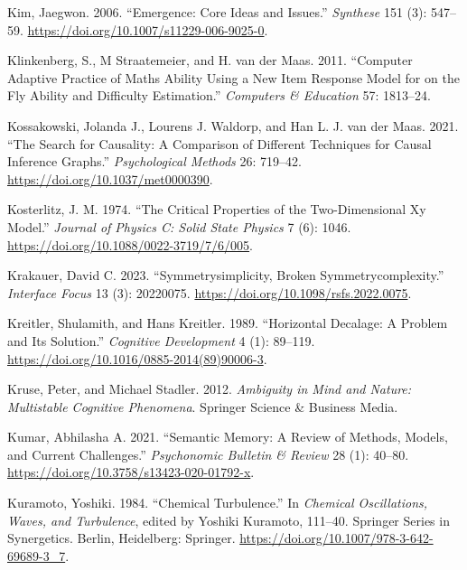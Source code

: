 \documentclass[
  letterpaper,
]{scrbook}
\newlength{\cslhangindent}
\newlength{\cslentryspacingunit} %
\newenvironment{CSLReferences}[2] %
 {%
  \setlength{\parindent}{0pt}
  \ifodd #1
  \let\oldpar\par
  \def\par{\hangindent=\cslhangindent\oldpar}
  \fi
  \setlength{\parskip}{#2\cslentryspacingunit}
 }%
 {}
\begin{document}
\begin{CSLReferences}{1}{0}
\leavevmode{}%
Kim, Jaegwon. 2006. {``Emergence: {Core} Ideas and Issues.''}
\emph{Synthese} 151 (3): 547--59.
\url{https://doi.org/10.1007/s11229-006-9025-0}.

\leavevmode{}%
Klinkenberg, S., M Straatemeier, and H. van der Maas. 2011. {``Computer
Adaptive Practice of {Maths} Ability Using a New Item Response Model for
on the Fly Ability and Difficulty Estimation.''} \emph{Computers \&
Education} 57: 1813--24.

\leavevmode{}%
Kossakowski, Jolanda J., Lourens J. Waldorp, and Han L. J. van der Maas.
2021. {``The Search for Causality: {A} Comparison of Different
Techniques for Causal Inference Graphs.''} \emph{Psychological Methods}
26: 719--42. \url{https://doi.org/10.1037/met0000390}.

\leavevmode{}%
Kosterlitz, J. M. 1974. {``The Critical Properties of the
Two-Dimensional Xy Model.''} \emph{Journal of Physics C: Solid State
Physics} 7 (6): 1046. \url{https://doi.org/10.1088/0022-3719/7/6/005}.

\leavevmode{}%
Krakauer, David C. 2023. {``Symmetry\textendash simplicity, Broken
Symmetry\textendash complexity.''} \emph{Interface Focus} 13 (3):
20220075. \url{https://doi.org/10.1098/rsfs.2022.0075}.

\leavevmode{}%
Kreitler, Shulamith, and Hans Kreitler. 1989. {``Horizontal Decalage:
{A} Problem and Its Solution.''} \emph{Cognitive Development} 4 (1):
89--119. \url{https://doi.org/10.1016/0885-2014(89)90006-3}.

\leavevmode{}%
Kruse, Peter, and Michael Stadler. 2012. \emph{Ambiguity in {Mind} and
{Nature}: {Multistable Cognitive Phenomena}}. {Springer Science \&
Business Media}.

\leavevmode{}%
Kumar, Abhilasha A. 2021. {``Semantic Memory: {A} Review of Methods,
Models, and Current Challenges.''} \emph{Psychonomic Bulletin \& Review}
28 (1): 40--80. \url{https://doi.org/10.3758/s13423-020-01792-x}.

\leavevmode{}%
Kuramoto, Yoshiki. 1984. {``Chemical {Turbulence}.''} In \emph{Chemical
{Oscillations}, {Waves}, and {Turbulence}}, edited by Yoshiki Kuramoto,
111--40. Springer {Series} in {Synergetics}. {Berlin, Heidelberg}:
{Springer}. \url{https://doi.org/10.1007/978-3-642-69689-3_7}.


\end{CSLReferences}
\end{document}
